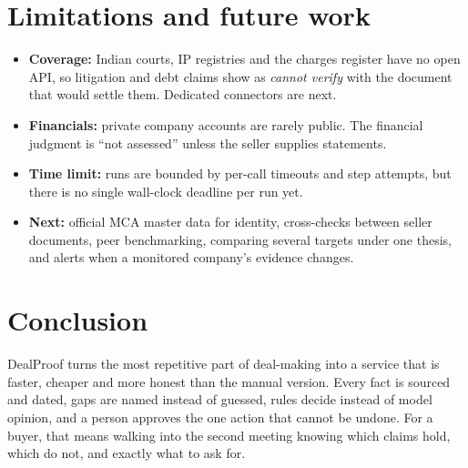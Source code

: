 \documentclass[11pt,a4paper]{article}
\begin{document}
\section{Limitations and future work}
\begin{itemize}
  \item \textbf{Coverage:} Indian courts, IP registries and the charges register have no open API, so litigation and debt claims show as \emph{cannot verify} with the document that would settle them. Dedicated connectors are next.
  \item \textbf{Financials:} private company accounts are rarely public. The financial judgment is ``not assessed'' unless the seller supplies statements.
  \item \textbf{Time limit:} runs are bounded by per-call timeouts and step attempts, but there is no single wall-clock deadline per run yet.
  \item \textbf{Next:} official MCA master data for identity, cross-checks between seller documents, peer benchmarking, comparing several targets under one thesis, and alerts when a monitored company's evidence changes.
\end{itemize}

\section{Conclusion}
DealProof turns the most repetitive part of deal-making into a service that is faster, cheaper and more honest than the manual version. Every fact is sourced and dated, gaps are named instead of guessed, rules decide instead of model opinion, and a person approves the one action that cannot be undone. For a buyer, that means walking into the second meeting knowing which claims hold, which do not, and exactly what to ask for.
\end{document}
